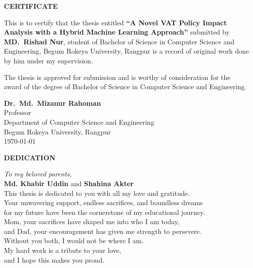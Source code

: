 \begin{center}
    {\Large\bfseries CERTIFICATE}
\end{center}

\vspace{1cm}

This is to certify that the thesis entitled \textbf{``A Novel VAT Policy Impact Analysis with a Hybrid Machine Learning Approach''} submitted by \textbf{MD.\ Rishad Nur}, student of Bachelor of Science in Computer Science and Engineering, Begum Rokeya University, Rangpur is a record of original work done by him under my supervision.

\vspace{1cm}

The thesis is approved for submission and is worthy of consideration for the award of the degree of Bachelor of Science in Computer Science and Engineering.

\vspace{3cm}

\begin{flushright}
    \textbf{Dr.\ Md.\ Mizanur Rahoman}\\
    Professor\\
    Department of Computer Science and Engineering\\
    Begum Rokeya University, Rangpur\\
    \today
\end{flushright}

\newpage
\thispagestyle{empty}
\vspace*{4cm}

\begin{center}
    {\Large\bfseries DEDICATION}
\end{center}

\vspace{2cm}

\begin{center}
    \textit{To my beloved parents,}\\[0.5cm]
    \textbf{Md. Khabir Uddin} and \textbf{Shahina Akter}\\[1cm]
    
    This thesis is dedicated to you with all my love and gratitude.\\[0.5cm]
    
    Your unwavering support, endless sacrifices, and boundless dreams\\
    for my future have been the cornerstone of my educational journey.\\[0.8cm]
    
    Mom, your sacrifices have shaped me into who I am today,\\
    and Dad, your encouragement has given me strength to persevere.\\[0.8cm]
    
    Without you both, I would not be where I am.\\[0.5cm]
    
    My hard work is a tribute to your love,\\
    and I hope this makes you proud.
\end{center}    

\newpage